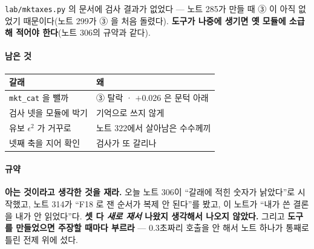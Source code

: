 \documentclass[10pt]{article}
\begin{document}
\texttt{lab/mktaxes.py} 의 문서에 검사 결과가 없었다 --- 노트 285가 만들 때
③ 이 아직 없었기 때문이다(노트 299가 ③ 을 처음 돌렸다). \textbf{도구가
나중에 생기면 옛 모듈에 소급해 적어야 한다}(노트 306의 규약과 같다).

\paragraph{남은 것}
\begin{center}\small
\begin{tabular}{ll}
\hline
갈래 & 왜 \\
\hline
\texttt{mkt\_cat} 을 뺄까 & ③ 탈락 · $+$0.026 은 문턱 아래 \\
검사 넷을 모듈에 박기 & 기억으로 쓰지 않게 \\
유보 $\epsilon^2$ 가 거꾸로 & 노트 322에서 살아남은 수수께끼 \\
넷째 축을 지어 확인 & 검사가 또 갈리나 \\
\hline
\end{tabular}
\end{center}

\paragraph{규약} \textbf{아는 것이라고 생각한 것을 재라.} 오늘 노트 306이
``갈래에 적힌 숫자가 낡았다''로 시작했고, 노트 314가 ``F18 로 잰 순서가
복제 안 된다''를 봤고, 이 노트가 ``내가 쓴 결론을 내가 안 읽었다''다.
\textbf{셋 다 \emph{새로 재서} 나왔지 생각해서 나오지 않았다.}
그리고 \textbf{도구를 만들었으면 주장할 때마다 부르라} --- 0.3초짜리
호출을 안 해서 노트 하나가 통째로 틀린 전제 위에 섰다.
\end{document}
